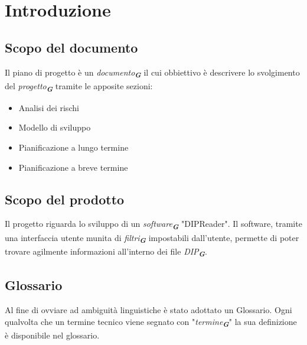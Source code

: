 \documentclass[a4paper,12pt]{article}
\newcommand{\glossario}[1]{\textit{#1}\textsubscript{\textbf{\textit{\textcolor{lightblack}{G}}}}}
\begin{document}
\begin{table}[H]
\end{table}

\tableofcontents

\newpage


\section{Introduzione}
\subsection{Scopo del documento}
Il piano di progetto è un \glossario{documento} il cui obbiettivo è descrivere lo svolgimento del \glossario{progetto} tramite le apposite sezioni: 
\begin{itemize}
    \item Analisi dei rischi
    \item Modello di sviluppo
    \item Pianificazione a lungo termine
    \item Pianificazione a breve termine
\end{itemize}
\subsection{Scopo del prodotto}
Il progetto riguarda lo sviluppo di un \glossario{software} "DIPReader". Il software, tramite una interfaccia utente munita di \glossario{filtri} impostabili dall'utente, permette di poter trovare agilmente informazioni all'interno dei file \glossario{DIP}.
\subsection{Glossario}
Al fine di ovviare ad ambiguità linguistiche è stato adottato un Glossario. Ogni qualvolta che un termine tecnico viene segnato con "\glossario{termine}" la sua definizione è disponibile nel glossario.
\end{document}
